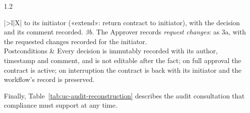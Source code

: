 \begin{spacing}{1.2}
{\begin{xltabular}{\linewidth}{|>{\bfseries}l|X|}
                      to its initiator («extend»: return contract to
                      initiator), with the decision and its comment
                      recorded. \textit{3b.} The Approver records
                      \textit{request changes}: as 3a, with the requested
                      changes recorded for the initiator. \\ \hline
    Postconditions  & Every decision is immutably recorded with its
                      author, timestamp and comment, and is not editable
                      after the fact; on full approval the contract is
                      active; on interruption the contract is back with
                      its initiator and the workflow's record is
                      preserved. \\ \hline
  \end{xltabular}}

Finally, Table~\ref{tab:uc-audit-reconstruction} describes the audit
consultation that compliance must support at any time.


\end{spacing}
